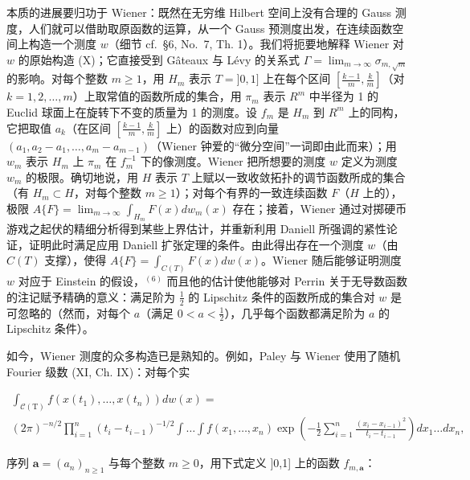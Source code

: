 本质的进展要归功于 Wiener：既然在无穷维 Hilbert 空间上没有合理的 Gauss 测度，人们就可以借助取原函数的运算，从一个 Gauss 预测度出发，在连续函数空间上构造一个测度 \(w\)（细节 cf.~§6, No.~7, Th. 1）。我们将扼要地解释 Wiener 对 \(w\) 的原始构造 (X)；它直接受到 Gâteaux 与 Lévy 的关系式 \(\Gamma = \lim_{m \to \infty} \sigma_{m,\sqrt{m}}\) 的影响。对每个整数 \(m \geqslant 1\)，用 \(H_m\) 表示 \(T = ]0,1]\) 上在每个区间 \(\left[ \frac{k-1}{m}, \frac{k}{m} \right]\)（对 \(k = 1,2,\ldots,m\)）上取常值的函数所成的集合，用 \(\pi_m\) 表示 \(R^m\) 中半径为 1 的 Euclid 球面上在旋转下不变的质量为 1 的测度。设 \(f_m\) 是 \(H_m\) 到 \(R^m\) 上的同构，它把取值 \(a_k\)（在区间 \(\left[ \frac{k-1}{m}, \frac{k}{m} \right]\) 上）的函数对应到向量 \((a_1, a_2 - a_1, \ldots, a_m - a_{m-1})\)（Wiener 钟爱的“微分空间”一词即由此而来）；用 \(w_m\) 表示 \(H_m\) 上 \(\pi_m\) 在 \(f_m^{-1}\) 下的像测度。Wiener 把所想要的测度 \(w\) 定义为测度 \(w_m\) 的极限。确切地说，用 \(H\) 表示 \(T\) 上赋以一致收敛拓扑的调节函数所成的集合（有 \(H_m \subset H\)，对每个整数 \(m \geqslant 1\)）；对每个有界的一致连续函数 \(F\)（\(H\) 上的），极限 \(A\{F\} = \lim_{m \to \infty} \int_{H_m} F(x) dw_m(x)\) 存在；接着，Wiener 通过对掷硬币游戏之起伏的精细分析得到某些上界估计，并重新利用 Daniell 所强调的紧性论证，证明此时满足应用 Daniell 扩张定理的条件。由此得出存在一个测度 \(w\)（由 \(C(T)\) 支撑），使得 \(A\{F\} = \int_{C(T)} F(x) dw(x)\)。Wiener 随后能够证明测度 \(w\) 对应于 Einstein 的假设，\(^{(6)}\) 而且他的估计使他能够对 Perrin 关于无导数函数的注记赋予精确的意义：满足阶为 \(\frac{1}{2}\) 的 Lipschitz 条件的函数所成的集合对 \(w\) 是可忽略的（然而，对每个 \(a\)（满足 \(0 < a < \frac{1}{2}\)），几乎每个函数都满足阶为 \(a\) 的 Lipschitz 条件）。

如今，Wiener 测度的众多构造已是熟知的。例如，Paley 与 Wiener 使用了随机 Fourier 级数 (XI, Ch. IX)：对每个实

\[
\begin{array}{l} \int_ {\mathcal {C} (\mathrm{T})} f (x (t _ {1}), \dots , x (t _ {n})) d w (x) = \\ (2 \pi) ^ {- n / 2} \prod_ {i = 1} ^ {n} (t _ {i} - t _ {i - 1}) ^ {- 1 / 2} \int \dots \int f (x _ {1}, \dots , x _ {n}) \exp \left(- \frac {1}{2} \sum_ {i = 1} ^ {n} \frac {(x _ {i} - x _ {i - 1}) ^ {2}}{t _ {i} - t _ {i - 1}}\right) d x _ {1} \dots d x _ {n}, \end{array}
\]

序列 \(\mathbf{a} = (a_n)_{n\geqslant 1}\) 与每个整数 \(m\geqslant 0\)，用下式定义 ]0,1] 上的函数 \(f_{m,\mathbf{a}}\)：

